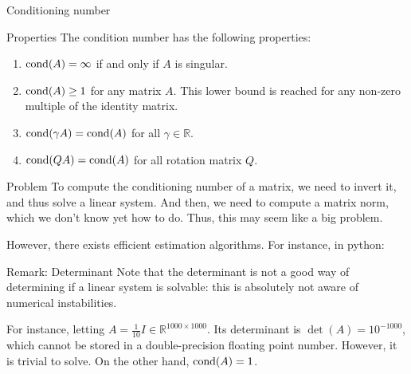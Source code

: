 \documentclass[a4paper]{article}
\begin{document}
\begin{parag}{Conditioning number}
    \begin{subparag}{Properties}
         The condition number has the following properties:
        \begin{enumerate}
            \item $\cond\left(A\right) = \infty$ if and only if $A$ is singular.
            \item $\cond\left(A\right) \geq 1$ for any matrix $A$. This lower bound is reached for any non-zero multiple of the identity matrix.
            \item $\cond\left(\gamma A\right) = \cond\left(A\right)$ for all $\gamma \in \mathbb{R}$.
            \item $\cond\left(QA\right) = \cond\left(A\right)$ for all rotation matrix $Q$.
        \end{enumerate}
    \end{subparag}
    
    \begin{subparag}{Problem}
        To compute the conditioning number of a matrix, we need to invert it, and thus solve a linear system. And then, we need to compute a matrix norm, which we don't know yet how to do. Thus, this may seem like a big problem.

        However, there exists efficient estimation algorithms. For instance, in python:
    \end{subparag}
    
\end{parag}

\begin{parag}{Remark: Determinant}
    Note that the determinant is not a good way of determining if a linear system is solvable: this is absolutely not aware of numerical instabilities.

    For instance, letting $A = \frac{1}{10} I \in \mathbb{R}^{1000 \times 1000}$. Its determinant is $\det\left(A\right) = 10^{-1000}$, which cannot be stored in a double-precision floating point number. However, it is trivial to solve. On the other hand, $\cond\left(A\right) = 1$.
\end{parag}
\end{document}
